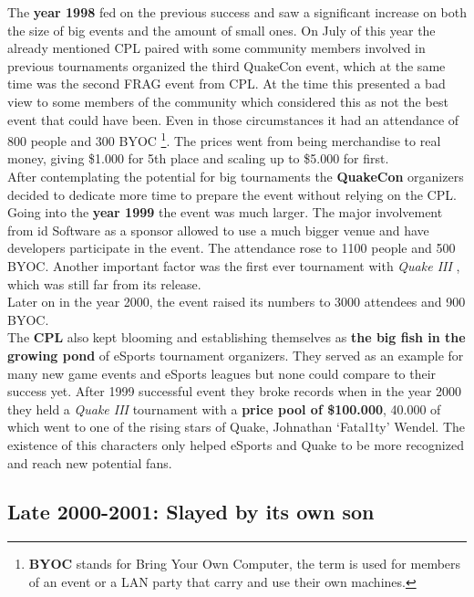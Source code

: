 The \textbf{year 1998} fed on the previous success and saw a significant increase on both the size of big events and the amount of small ones. On July of this year the already mentioned CPL paired with some community members involved in previous tournaments organized the third QuakeCon event, which at the same time was the second FRAG event from CPL. At the time this presented a bad view to some members of the community which considered this as not the best event that could have been. Even in those circumstances it had an attendance of 800 people and 300 BYOC \footnote{\textbf{BYOC} stands for Bring Your Own Computer, the term is used for members of an event or a LAN party that carry and use their own machines.}. The prices went from being merchandise to real money, giving \$1.000 for 5th place and scaling up to \$5.000 for first.\\

After contemplating the potential for big tournaments the \textbf{QuakeCon} organizers decided to dedicate more time to prepare the event without relying on the CPL. Going into the \textbf{year 1999} the event was much larger. The major involvement from id Software as a sponsor allowed to use a much bigger venue and have developers participate in the event. The attendance rose to 1100 people and 500 BYOC. Another important factor was the first ever tournament with \textit{Quake III} \citep{game:quake3}, which was still far from its release.\\ Later on in the year 2000, the event raised its numbers to 3000 attendees and 900 BYOC.\\

The \textbf{CPL} also kept blooming and establishing themselves as \textbf{the big fish in the growing pond} of eSports tournament organizers. They served as an example for many new game events and eSports leagues but none could compare to their success yet. After 1999 successful event they broke records when in the year 2000 they held a \textit{Quake III} tournament with a \textbf{price pool of \$100.000}, 40.000 of which went to one of the rising stars of Quake, Johnathan ‘Fatal1ty’ Wendel. The existence of this characters only helped eSports and Quake to be more recognized and reach new potential fans.


\subsection{Late 2000-2001: Slayed by its own son}






